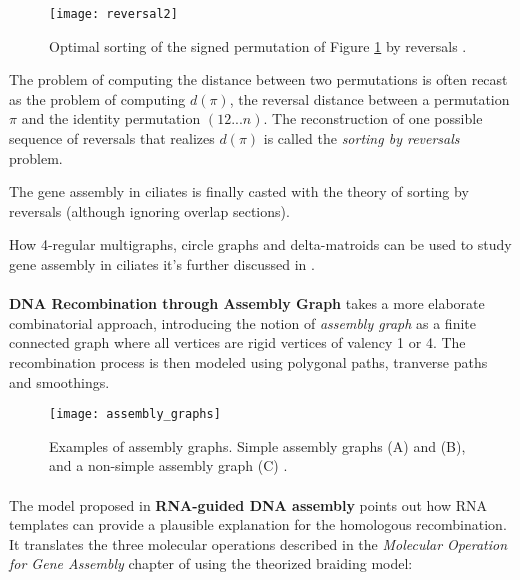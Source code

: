 \begin{figure}[h]
  \centering
    \texttt{[image: reversal2]}
  \caption{Optimal sorting of the signed permutation of Figure \ref{fig:reversal1} by reversals \cite{DBLP:journals/corr/Brijder17}.}

\end{figure}

The problem of computing the distance between two permutations is often recast as the problem of computing $d(\pi)$, the reversal distance between a permutation $\pi$ and the identity permutation $(1 2 ... n)$. The reconstruction of one possible sequence of reversals that realizes $d(\pi)$ is called the \textit{sorting by reversals} problem.

The gene assembly in ciliates is finally casted with the theory of sorting by reversals (although ignoring overlap sections).

How 4-regular multigraphs, circle graphs and delta-matroids can be used to study gene assembly in ciliates it's further discussed in \cite{Brijder2014}.

\paragraph{}
\textbf{DNA Recombination through Assembly Graph}\cite{ANGELESKA20093020} takes a more elaborate combinatorial approach, introducing the notion of \textit{assembly graph} as a finite connected graph where all vertices are rigid vertices of valency 1 or 4. The recombination process is then modeled using polygonal paths, tranverse paths and smoothings.
\begin{figure}[h]
  \centering
    \texttt{[image: assembly\_graphs]}
  \caption{ Examples of assembly graphs. Simple assembly graphs (A) and (B), and a non-simple assembly graph (C) \cite{ANGELESKA20093020}.}
  \label{fig:reversal1}
\end{figure}

\paragraph{}

The model proposed in \textbf{RNA-guided DNA assembly} \cite{ANGELESKA2007706} points out how RNA templates can provide a plausible explanation for the homologous recombination. It translates the three molecular operations described in the \textit{Molecular Operation for Gene Assembly} chapter of \cite{Ehrenfeucht:2004:CLC:971120} using the theorized braiding model:

